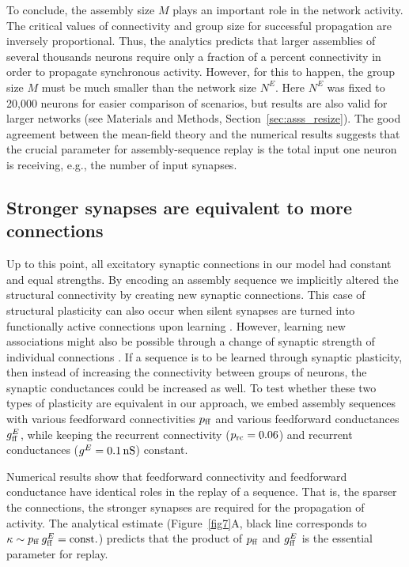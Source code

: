     To conclude, the assembly size $M$ plays an important role in the network
    activity. The critical values of connectivity and group size for
    successful propagation are inversely proportional. Thus, the analytics
    predicts that larger assemblies of several thousands neurons require only a
    fraction of a percent connectivity in order to propagate synchronous
    activity. However, for this to happen, the group size $M$ must be much
    smaller than the network size $N^E$. Here $N^E$ was fixed to 20,000
    neurons for easier comparison of scenarios, but results are also valid for
    larger networks (see Materials and Methods, Section~\ref{sec:asss_resize}). The good agreement between
    the mean-field theory and the numerical results suggests that the crucial
    parameter for assembly-sequence replay is the total input one neuron is
    receiving, e.g., the number of input synapses.

  \subsection{Stronger synapses are equivalent to more connections}
    Up to this point, all excitatory synaptic connections in our model had
    constant and equal strengths.  By encoding an assembly sequence we
    implicitly altered the structural connectivity by creating new synaptic
    connections.  This case of structural plasticity can also occur when silent
    synapses are turned into functionally active connections upon learning
    \citep{Atwood1999, Hanse2013}.  However, learning new associations might
    also be possible through a change of synaptic strength of individual
    connections \citep{Bliss1973, Malenka2004}.  If a sequence is to be learned
    through synaptic plasticity, then instead of increasing the connectivity
    between groups of neurons, the synaptic conductances could be increased as
    well.  To test whether these two types of plasticity are equivalent in our
    approach, we embed assembly sequences with various feedforward
    connectivities $p_{\rm ff}$ and various feedforward conductances
    $g^{E}_{\rm ff}$, while keeping the recurrent connectivity ($p_{\rm
    rc}=0.06$) and recurrent conductances ($g^E=0.1 \, \rm nS$) constant.

    Numerical results show that feedforward connectivity and feedforward
    conductance have identical roles in the replay of a sequence.  That is, the
    sparser the connections, the stronger synapses are required for the
    propagation of activity.  The analytical estimate (Figure~\ref{fig7}A,
    black line corresponds to $\kappa \sim p_{\rm ff} \, g^{E}_{\rm ff} = {\rm
    const.}$) predicts that the product of $p_{\rm ff}$ and $g^{E}_{\rm ff}$ is
    the essential parameter for replay.

